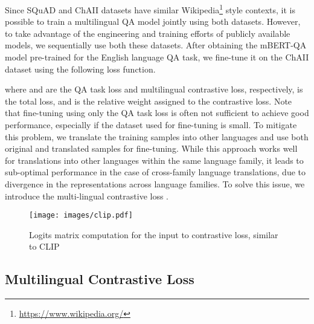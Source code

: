 \documentclass[11pt]{article}
\begin{document}
Since SQuAD \cite{rajpurkar2016SQuAD} and ChAII \cite{ChAII} datasets have similar Wikipedia\footnote{\url{https://www.wikipedia.org/}} style contexts, it is possible to train a multilingual QA model jointly using both datasets. However, to take advantage of the engineering and training efforts of publicly available models, we sequentially use both these datasets. After obtaining the mBERT-QA model pre-trained for the English language QA task, we fine-tune it on the ChAII dataset using the following loss function.



\noindent where  and  are the QA task loss and multilingual contrastive loss, respectively,  is the total loss, and  is the relative weight assigned to the contrastive loss. Note that fine-tuning using only the QA task loss is often not sufficient to achieve good performance, especially if the dataset used for fine-tuning is small. To mitigate this problem, we translate the training samples into other languages and use both original and translated samples for fine-tuning. While this approach works well for translations into other languages within the same language family, it leads to sub-optimal performance in the case of cross-family language translations, due to divergence in the representations across language families. To solve this issue, we introduce the multi-lingual contrastive loss .
 
\begin{figure*}[ht]
\centering
   \texttt{[image: images/clip.pdf]}
   \caption{Logits matrix computation for the input to contrastive loss, similar to CLIP \cite{radford2021learning}}
   \label{fig:contrastive}
\end{figure*}

\subsection{Multilingual Contrastive Loss}
\label{sec:contrastive}
\end{document}
